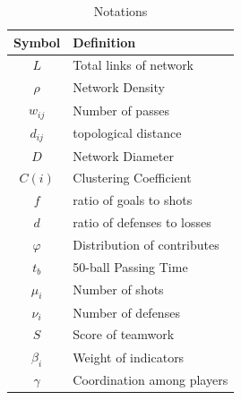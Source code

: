 \documentclass[12pt,a4paper]{report}
\begin{document}
\begin{table}[!htbp]
    \begin{center}
        \caption{Notations}
        \begin{tabular}{c|l}
            \toprule
            \multicolumn{1}{m{3cm}}{\centering Symbol}
                      & \multicolumn{1}{m{8cm}}{\centering Definition} \\
            \midrule
            $L$       & Total links of network                         \\
            $\rho$    & Network Density                                \\
            $w_{ij}$  & Number of passes                               \\
            $d_{ij}$  & topological distance                           \\
            $D$       & Network Diameter                               \\
            $C(i)$    & Clustering Coefficient                         \\
            $f$       & ratio of goals to shots                        \\
            $d$       & ratio of defenses to losses                    \\
            $\varphi$ & Distribution of contributes                    \\
            $t_b$     & 50-ball Passing Time                           \\
            $\mu_i$   & Number of shots                                \\
            $\nu_i$   & Number of defenses                             \\
            $S$       & Score of teamwork                              \\
            $\beta_i$ & Weight of indicators                           \\
            $\gamma$  & Coordination among players                     \\
            \bottomrule
        \end{tabular}\label{tb:notation}
    \end{center}
\end{table}
\end{document}
